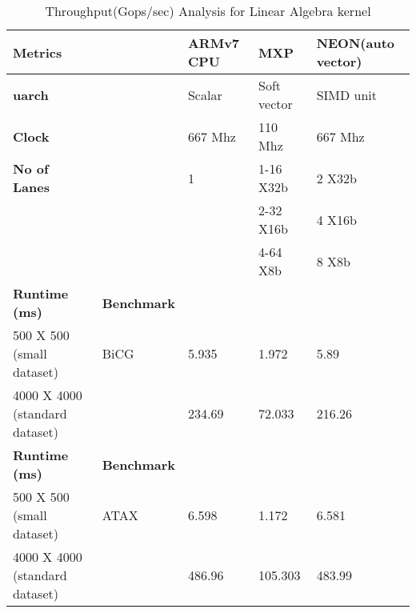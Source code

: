 

\begin{table}[htbp]
	\centering
	\begin{adjustbox}{width= .8\textwidth}
		\small
		\begin{tabular}{rrrrr}
			\toprule
			\multicolumn{1}{l}{\textbf{Metrics}} &   & \multicolumn{1}{l}{\textbf{ARMv7 CPU}} & \multicolumn{1}{l}{\textbf{MXP}} & \multicolumn{1}{l}{\textbf{NEON(auto vector)}} \\
			\midrule
			\multicolumn{1}{l}{\textbf{uarch}} &   & \multicolumn{1}{l}{Scalar} & \multicolumn{1}{l}{Soft vector} & \multicolumn{1}{l}{SIMD unit} \\
			\multicolumn{1}{l}{\textbf{Clock}} &   & \multicolumn{1}{l}{667 Mhz} & \multicolumn{1}{l}{110 Mhz} & \multicolumn{1}{l}{667 Mhz} \\
			\multicolumn{1}{l}{\textbf{No of Lanes}} &   & \multicolumn{1}{l}{1} & \multicolumn{1}{l}{1-16 X32b} & \multicolumn{1}{l}{2 X32b} \\
			&   &   & \multicolumn{1}{l}{2-32 X16b} & \multicolumn{1}{l}{4 X16b} \\
			&   &   & \multicolumn{1}{l}{4-64 X8b} & \multicolumn{1}{l}{8 X8b} \\
			\midrule
			\multicolumn{1}{l}{\textbf{Runtime (ms)}} & \multicolumn{1}{l}{\textbf{Benchmark}} &   &   &  \\
			\midrule
			\multicolumn{1}{l}{500 X 500 (small dataset)} & \multicolumn{1}{l}{BiCG} & \multicolumn{1}{l}{5.935} & \multicolumn{1}{l}{1.972} & \multicolumn{1}{l}{5.89} \\
			\multicolumn{1}{l}{4000 X 4000 (standard dataset)} &   & \multicolumn{1}{l}{234.69} & \multicolumn{1}{l}{72.033} & \multicolumn{1}{l}{216.26} \\
			\midrule
			\multicolumn{1}{l}{\textbf{Runtime (ms)}} & \multicolumn{1}{l}{\textbf{Benchmark}} &   &   &  \\
			\midrule
			\multicolumn{1}{l}{500 X 500 (small dataset)} & \multicolumn{1}{l}{ATAX} & \multicolumn{1}{l}{6.598} & \multicolumn{1}{l}{1.172} & \multicolumn{1}{l}{6.581} \\
			\multicolumn{1}{l}{4000 X 4000 (standard dataset)} &   & \multicolumn{1}{l}{486.96} & \multicolumn{1}{l}{105.303} & \multicolumn{1}{l}{483.99} \\
			\bottomrule
		\end{tabular}%
	\end{adjustbox}%
	\caption{Throughput(Gops/sec) Analysis for Linear Algebra kernel}
	\label{lin:a}%
\end{table}%
